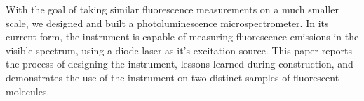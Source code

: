 With the goal of taking similar fluorescence measurements on a much smaller scale, we designed and built a photoluminescence microspectrometer. In its current form, the instrument is capable of measuring fluorescence emissions in the visible spectrum, using a diode laser as it's excitation source. This paper reports the process of designing the instrument, lessons learned during construction, and demonstrates the use of the instrument on two distinct samples of fluorescent molecules.
